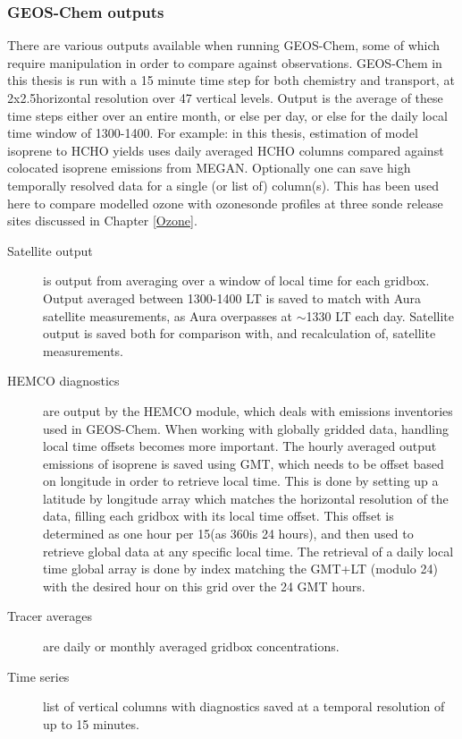     \subsubsection{GEOS-Chem outputs}
      \label{Model:GC:simulation:outputs}
      There are various outputs available when running GEOS-Chem, some of which require manipulation in order to compare against observations.
      GEOS-Chem in this thesis is run with a 15 minute time step for both chemistry and transport, at 2x2.5\degr horizontal resolution over 47 vertical levels.
      Output is the average of these time steps either over an entire month, or else per day, or else for the daily local time window of 1300-1400.
      For example: in this thesis, estimation of model isoprene to HCHO yields uses daily averaged HCHO columns compared against colocated isoprene emissions from MEGAN.
      Optionally one can save high temporally resolved data for a single (or list of) column(s).
      This has been used here to compare modelled ozone with ozonesonde profiles at three sonde release sites discussed in Chapter \ref{Ozone}.
      
      \begin{description}
        \item[Satellite output]%
        is output from averaging over a window of local time for each gridbox. 
        Output averaged between 1300-1400 LT is saved to match with Aura satellite measurements, as Aura overpasses at $\sim$1330 LT each day.
        Satellite output is saved both for comparison with, and recalculation of, satellite measurements.
        \item[HEMCO diagnostics]%
        are output by the HEMCO module, which deals with emissions inventories used in GEOS-Chem.
        When working with globally gridded data, handling local time offsets becomes more important.
        The hourly averaged output emissions of isoprene is saved using GMT, which needs to be offset based on longitude in order to retrieve local time.
        This is done by setting up a latitude by longitude array which matches the horizontal resolution of the data, filling each gridbox with its local time offset.
        This offset is determined as one hour per 15\degr (as 360\degr is 24 hours), and then used to retrieve global data at any specific local time.
        The retrieval of a daily local time global array is done by index matching the GMT+LT (modulo 24) with the desired hour on this grid over the 24 GMT hours.
        \item[Tracer averages]%
        are daily or monthly averaged gridbox concentrations. 
        \item[Time series]%
        list of vertical columns with diagnostics saved at a temporal resolution of up to 15 minutes.
        
        
      \end{description}
    
